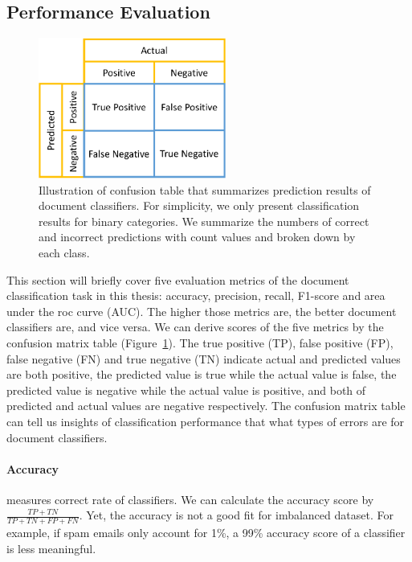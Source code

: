\subsection{Performance Evaluation}
\label{chap2:subsec:eval}

\begin{figure}[t!]
\centering
\includegraphics[width=0.55\textwidth]{images/chapter2/confusion-table.pdf}
\caption{Illustration of confusion table that summarizes prediction results of document classifiers. For simplicity, we only present classification results for binary categories. We summarize the numbers of correct and incorrect predictions with count values and broken down by each class.}
\label{chap2:fig:confusion}
\end{figure}


This section will briefly cover five evaluation metrics of the document classification task in this thesis: accuracy, precision, recall, F1-score and area under the roc curve (AUC).
The higher those metrics are, the better document classifiers are, and vice versa.
We can derive scores of the five metrics by the confusion matrix table (Figure~\ref{chap2:fig:confusion}). 
The true positive (TP), false positive (FP), false negative (FN) and true negative (TN) indicate actual and predicted values are both positive, the predicted value is true while the actual value is false, the predicted value is negative while the actual value is positive, and both of predicted and actual values are negative respectively.
The confusion matrix table can tell us insights of classification performance that what types of errors are for document classifiers.


\paragraph{Accuracy} measures correct rate of classifiers. We can calculate the accuracy score by $\frac{TP+TN}{TP+TN+FP+FN}$. Yet, the accuracy is not a good fit for imbalanced dataset. For example, if spam emails only account for 1\%, a 99\% accuracy score of a classifier is less meaningful.

